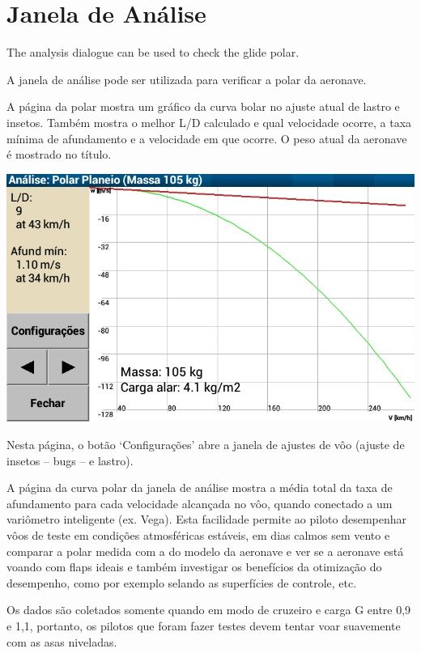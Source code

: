 \section{Janela de Análise}

The analysis dialogue can be used to check the glide polar.  

A janela de análise pode ser utilizada para verificar a polar da aeronave.

A página da polar mostra um gráfico da curva bolar no ajuste atual de lastro e insetos.  Também mostra o melhor L/D calculado e qual velocidade ocorre, a taxa mínima de afundamento e a velocidade em que ocorre.  O peso atual da aeronave é mostrado no título.  


\begin{center}
\includegraphics[angle=0,width=0.8\linewidth,keepaspectratio='true']{figures/analysis-glidepolar.png}
\end{center}

Nesta página, o botão ‘Configurações’ abre a janela de ajustes de vôo (ajuste de insetos – bugs – e lastro).

A página da curva polar da janela de análise mostra a média total da taxa de afundamento para cada velocidade alcançada no vôo, quando conectado a um variômetro inteligente (ex. Vega).  Esta facilidade permite ao piloto desempenhar vôos de teste em condições atmosféricas estáveis, em dias calmos sem vento e comparar a polar medida com a do modelo da aeronave e ver se a aeronave está voando com flaps ideais e também investigar os benefícios da otimização do desempenho, como por exemplo selando as superfícies de controle, etc.

Os dados são coletados somente quando em modo de cruzeiro e carga G entre 0,9 e 1,1, portanto, os pilotos que foram fazer testes devem tentar voar suavemente com as asas niveladas.


